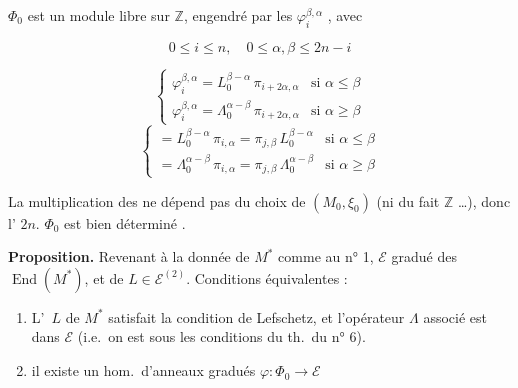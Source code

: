 
\struck{\ill{}} $\Phi_{0}$ est un module libre sur $\mathbb{Z}$, engendré par les $\varphi^{\beta,\alpha}_{i}$
\struck{\ill{}} 
, avec

\[ 0 \leqslant i \leqslant n , \quad 0 \leqslant \alpha, \beta \leqslant 2n-i \]


\[ \begin{cases} \varphi^{\beta,\alpha}_{i} = L_{0}^{\beta-\alpha}\, \pi_{i+2\alpha,\alpha} & \text{si } \alpha \leqslant \beta \\[2pt] \varphi^{\beta,\alpha}_{i} = \Lambda_{0}^{\alpha-\beta}\, \pi_{i+2\alpha,\alpha} & \text{si } \alpha \geqslant \beta \end{cases} \]
\[ \begin{cases} = L_{0}^{\beta-\alpha}\, \pi_{i,\alpha} = \pi_{j,\beta}\, L_{0}^{\beta-\alpha} & \text{si } \alpha \leqslant \beta \\[2pt] = \Lambda_{0}^{\alpha-\beta}\, \pi_{i,\alpha} = \pi_{j,\beta}\, \Lambda_{0}^{\alpha-\beta} & \text{si } \alpha \geqslant \beta \end{cases} \]

La multiplication des  ne dépend pas du choix de
$(M_{0}, \xi_{0})$ (ni du fait \ill{} $\mathbb{Z}$ \ldots), donc l'\ill{}
\ill{}  $2n$. $\Phi_{0}$ est bien
déterminé \ill{}.

\textbf{Proposition.} Revenant à la donnée de $M^{*}$ comme au n° 1,
$\mathcal{E}$   gradué des \struck{\ill{}}
$\operatorname{End}(M^{*})$, et de $L \in \mathcal{E}^{(2)}$.
Conditions équivalentes :

\begin{enumerate}
  \item L'\ $L$ de $M^{*}$ satisfait la condition de 
        Lefschetz, et l'opérateur $\Lambda$ associé est dans $\mathcal{E}$ (i.e.\ on
        est sous les conditions du th.\ du n° 6).
  \item il existe un hom.\ d'anneaux gradués
        $\varphi \colon \Phi_{0} \to \mathcal{E}$
\end{enumerate}

